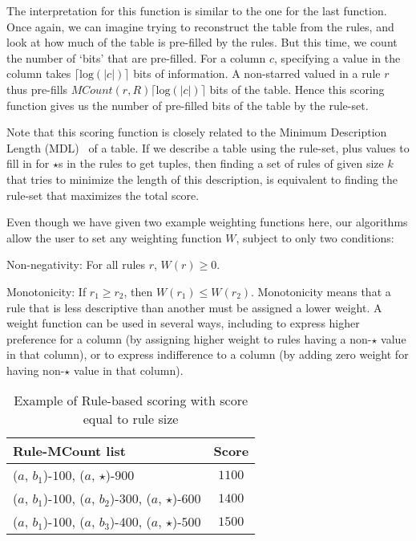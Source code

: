 The interpretation for this function is similar to the one for the last function. Once again, we can imagine trying to reconstruct the table from the rules, and look at how much of the table is pre-filled by the rules. But this time, we count the number of `bits' that are pre-filled. For a column $c$, specifying a value in the column takes $\lceil \text{log}(|c|)\rceil$ bits of information. A non-starred valued in a rule $r$ thus pre-fills $MCount(r,R) \lceil \text{log}(|c|) \rceil$ bits of the table. Hence this scoring function gives us the number of pre-filled bits of the table by the rule-set. 

Note that this scoring function is closely related to the Minimum Description Length (MDL)~\cite{Grunwald:2007:MDL:1213810} of a table. If we describe a table using the rule-set, plus values to fill in for $\star$s in the rules to get tuples, then finding a set of rules of given size $k$ that tries to minimize the length of this description, is equivalent to finding the rule-set that maximizes the total score. 

\smallskip

Even though we have given two example weighting functions here, our algorithms allow the user to set any weighting function $W$, subject to only two conditions:
\squishlist
\item Non-negativity: For all rules $r$, $W(r) \geq 0$.
\item Monotonicity: If $r_1 \geq r_2$, then $W(r_1) \leq W(r_2)$. Monotonicity means that a rule that is less descriptive than another must be assigned a lower weight.
\squishend
A weight function can be used in several ways, including to express higher preference for a column (by assigning higher weight to rules having a non-$\star$ value in that column), or to express indifference to a column (by adding zero weight for having non-$\star$ value in that column).

\begin{table}
\centering
\begin{tabular}{ | l | c | }
 \hline Rule-MCount list & Score \\ \hline
  ($a$, $b_1$)-$100$, ($a$, $\star$)-$900$ & $1100$ \\
  ($a$, $b_1$)-$100$, ($a$, $b_2$)-$300$, ($a$, $\star$)-$600$ & $1400$  \\
  ($a$, $b_1$)-$100$, ($a$, $b_3$)-$400$, ($a$, $\star$)-$500$ & $1500$ \\ \hline
\end{tabular}
\caption{Example of Rule-based scoring with score equal to rule size \label{table:sizescoringexample}}
\end{table}

